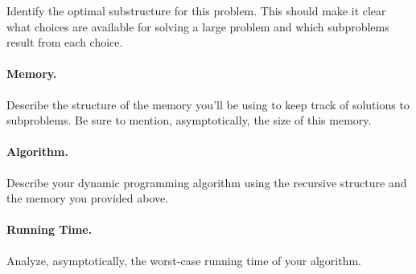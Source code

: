 Identify the optimal substructure for this problem. This should make it clear what choices are available for solving a large problem and which subproblems result from each choice.



\paragraph{Memory.}

Describe the structure of the memory you'll be using to keep track of solutions to subproblems. Be sure to mention, asymptotically, the size of this memory.


\paragraph{Algorithm.}

Describe your dynamic programming algorithm using the recursive structure and the memory you provided above.


\paragraph{Running Time.}

Analyze, asymptotically, the worst-case running time of your algorithm.

